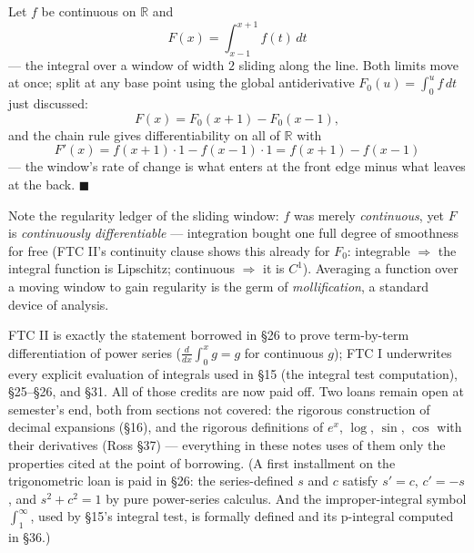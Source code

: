\documentclass[11pt]{report}
\begin{document}
\begin{exbox}
Let $f$ be continuous on $\mathbb{R}$ and
\[
F(x) = \int_{x-1}^{x+1} f(t)\,dt
\]
--- the integral over a window of width $2$ sliding along the line. Both limits move at once; split at any base point using the global antiderivative $F_0(u) = \int_0^u f\,dt$ just discussed:
\[
F(x) = F_0(x+1) - F_0(x-1),
\]
and the chain rule gives differentiability on all of $\mathbb{R}$ with
\[
F'(x) = f(x+1) \cdot 1 - f(x-1) \cdot 1 = f(x+1) - f(x-1)
\]
--- the window's rate of change is what enters at the front edge minus what leaves at the back. \hfill $\blacksquare$
\end{exbox}

\begin{rembox}
Note the regularity ledger of the sliding window: $f$ was merely \emph{continuous}, yet $F$ is \emph{continuously differentiable} --- integration bought one full degree of smoothness for free (FTC II's continuity clause shows this already for $F_0$: integrable $\Rightarrow$ the integral function is Lipschitz; continuous $\Rightarrow$ it is $C^1$). Averaging a function over a moving window to gain regularity is the germ of \emph{mollification}, a standard device of analysis.
\end{rembox}

\begin{rembox}
FTC II is exactly the statement borrowed in \S 26 to prove term-by-term differentiation of power series ($\tfrac{d}{dx}\int_0^x g = g$ for continuous $g$); FTC I underwrites every explicit evaluation of integrals used in \S 15 (the integral test computation), \S 25--\S 26, and \S 31. All of those credits are now paid off. Two loans remain open at semester's end, both from sections not covered: the rigorous construction of decimal expansions (\S 16), and the rigorous definitions of $e^x$, $\log$, $\sin$, $\cos$ with their derivatives (Ross \S 37) --- everything in these notes uses of them only the properties cited at the point of borrowing. (A first installment on the trigonometric loan is paid in \S 26: the series-defined $s$ and $c$ satisfy $s' = c$, $c' = -s$, and $s^2 + c^2 = 1$ by pure power-series calculus. And the improper-integral symbol $\int_1^\infty$, used by \S 15's integral test, is formally defined and its p-integral computed in \S 36.)
\end{rembox}

\end{document}
